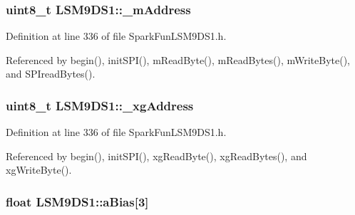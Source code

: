\subsubsection[{\texorpdfstring{\+\_\+m\+Address}{\_mAddress}}]{\setlength{\rightskip}{0pt plus 5cm}uint8\+\_\+t L\+S\+M9\+D\+S1\+::\+\_\+m\+Address\hspace{0.3cm}{\ttfamily [protected]}}\hypertarget{class_l_s_m9_d_s1_a7141933a2ccde95976e4eecd598ecb17}{}\label{class_l_s_m9_d_s1_a7141933a2ccde95976e4eecd598ecb17}


Definition at line 336 of file Spark\+Fun\+L\+S\+M9\+D\+S1.\+h.



Referenced by begin(), init\+S\+P\+I(), m\+Read\+Byte(), m\+Read\+Bytes(), m\+Write\+Byte(), and S\+P\+Iread\+Bytes().

\subsubsection[{\texorpdfstring{\+\_\+xg\+Address}{\_xgAddress}}]{\setlength{\rightskip}{0pt plus 5cm}uint8\+\_\+t L\+S\+M9\+D\+S1\+::\+\_\+xg\+Address\hspace{0.3cm}{\ttfamily [protected]}}\hypertarget{class_l_s_m9_d_s1_ac78b7fab605570a16433a4636f91451e}{}\label{class_l_s_m9_d_s1_ac78b7fab605570a16433a4636f91451e}


Definition at line 336 of file Spark\+Fun\+L\+S\+M9\+D\+S1.\+h.



Referenced by begin(), init\+S\+P\+I(), xg\+Read\+Byte(), xg\+Read\+Bytes(), and xg\+Write\+Byte().

\subsubsection[{\texorpdfstring{a\+Bias}{aBias}}]{\setlength{\rightskip}{0pt plus 5cm}float L\+S\+M9\+D\+S1\+::a\+Bias\mbox{[}3\mbox{]}}\hypertarget{class_l_s_m9_d_s1_abe998fcc50cfe729c13ab535337849c7}{}\label{class_l_s_m9_d_s1_abe998fcc50cfe729c13ab535337849c7}


